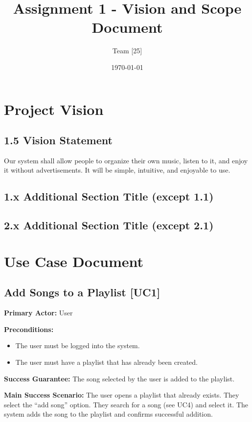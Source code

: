 \documentclass{article}
\title{Assignment 1 - Vision and Scope Document}
\author{Team [25]}
\date{\today}
\begin{document}
\maketitle

\section{Project Vision}


\subsection{1.5 Vision Statement} 
Our system shall allow people to organize their own music, listen to it, and enjoy it without advertisements. It will be simple, intuitive, and enjoyable to use.

\subsection{1.x Additional Section Title (except 1.1)} 

\subsection{2.x Additional Section Title (except 2.1)}

\section{Use Case Document}

\subsection{Add Songs to a Playlist [UC1]}
\textbf{Primary Actor:} User

\textbf{Preconditions:} 
\begin{itemize}
  \item The user must be logged into the system.
  \item The user must have a playlist that has already been created.
\end{itemize}

\textbf{Success Guarantee:}  
The song selected by the user is added to the playlist.

\textbf{Main Success Scenario:}  
The user opens a playlist that already exists. They select the ``add song'' option. They search for a song (see UC4) and select it. The system adds the song to the playlist and confirms successful addition.
\end{document}

